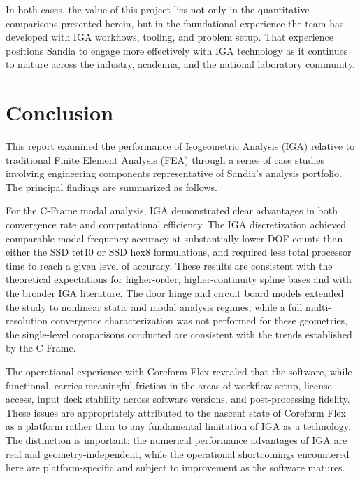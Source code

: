 \documentclass[12pt,report,justified]{SANDreport}
\begin{document}
In both cases, the value of this project lies not only in the quantitative comparisons
presented herein, but in the foundational experience the team has developed with IGA
workflows, tooling, and problem setup.  That experience positions Sandia to engage more
effectively with IGA technology as it continues to mature across the industry, academia,
and the national laboratory community.

\chapter{Conclusion}

This report examined the performance of Isogeometric Analysis (IGA) relative to
traditional Finite Element Analysis (FEA) through a series of case studies involving
engineering components representative of Sandia's analysis portfolio.  The principal
findings are summarized as follows.

For the C-Frame modal analysis, IGA demonstrated clear advantages in both convergence
rate and computational efficiency.  The IGA discretization achieved comparable modal
frequency accuracy at substantially lower DOF counts than either the SSD tet10 or SSD
hex8 formulations, and required less total processor time to reach a given level of
accuracy.  These results are consistent with the theoretical expectations for
higher-order, higher-continuity spline bases and with the broader IGA literature.  The
door hinge and circuit board models extended the study to nonlinear static and modal
analysis regimes; while a full multi-resolution convergence characterization was not
performed for these geometries, the single-level comparisons conducted are consistent
with the trends established by the C-Frame.

The operational experience with Coreform Flex revealed that the software, while
functional, carries meaningful friction in the areas of workflow setup, license access,
input deck stability across software versions, and post-processing fidelity.  These
issues are appropriately attributed to the nascent state of Coreform Flex as a platform
rather than to any fundamental limitation of IGA as a technology.  The distinction is
important: the numerical performance advantages of IGA are real and geometry-independent,
while the operational shortcomings encountered here are platform-specific and subject to
improvement as the software matures.
\end{document}
